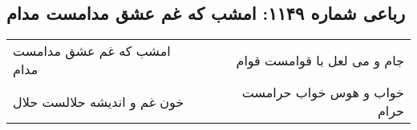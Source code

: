 \begin{center}
\section*{رباعی شماره ۱۱۴۹: امشب که غم عشق مدامست مدام}
\label{sec:1149}
\begin{longtable}{l p{0.5cm} r}
امشب که غم عشق مدامست مدام
&&
جام و می لعل با قوامست قوام
\\
خون غم و اندیشه حلالست حلال
&&
خواب و هوس خواب حرامست حرام
\\
\end{longtable}
\end{center}
